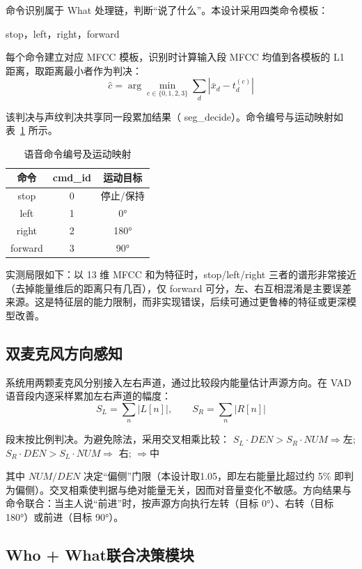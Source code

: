 \documentclass[UTF8,zihao=-4,fontset=windows]{ctexart}
\newcommand{\code}[1]{{\ttfamily #1}}
\begin{document}
命令识别属于 What 处理链，判断“说了什么”。本设计采用四类命令模板：
\begin{center}
stop，left，right，forward
\end{center}

每个命令建立对应 MFCC 模板，识别时计算输入段 MFCC 均值到各模板的 L1 距离，取距离最小者作为判决：
\[
\hat{c}=\arg\min_{c\in\{0,1,2,3\}}\sum_{d}\left|\bar{x}_d-t_d^{(c)}\right|
\]

该判决与声纹判决共享同一段累加结果（ \code{seg\_decide}）。命令编号与运动映射如表~\ref{tab:cmd} 所示。
\begin{table}[H]
\centering
\caption{语音命令编号及运动映射}
\label{tab:cmd}
\begin{tabular}{c c c}
\toprule
命令 & cmd\_id & 运动目标 \\
\midrule
stop & 0 & 停止/保持 \\
left & 1 & 0° \\
right & 2 & 180° \\
forward & 3 & 90° \\
\bottomrule
\end{tabular}
\end{table}

实测局限如下：以 13 维 MFCC 和为特征时，stop/left/right 三者的谱形非常接近（去掉能量维后的距离只有几百），仅 forward 可分，左、右互相混淆是主要误差来源。这是特征层的能力限制，而非实现错误，后续可通过更鲁棒的特征或更深模型改善。

\subsection{双麦克风方向感知}

系统用两颗麦克风分别接入左右声道，通过比较段内能量估计声源方向。在 VAD 语音段内逐采样累加左右声道的幅度：
\[
S_L=\sum_n|L[n]|,\qquad S_R=\sum_n|R[n]|
\]

段末按比例判决。为避免除法，采用交叉相乘比较：
$S_L\cdot DEN>S_R\cdot NUM\Rightarrow $左;\qquad
$S_R\cdot DEN>S_L\cdot NUM\Rightarrow$ 右;\qquad
{}$\Rightarrow $中

其中 $NUM/DEN$ 决定“偏侧”门限（本设计取1.05，即左右能量比超过约 5\% 即判为偏侧）。交叉相乘使判据与绝对能量无关，因而对音量变化不敏感。方向结果与命令联合：当主人说“前进”时，按声源方向执行左转（目标 0°）、右转（目标 180°）或前进（目标 90°）。

\subsection{Who + What联合决策模块}
\end{document}
